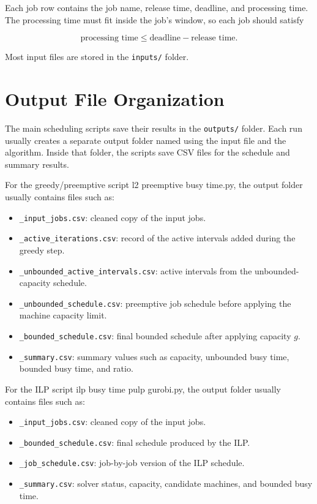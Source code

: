 \documentclass[12pt]{article}
\begin{document}
Each job row contains the job name, release time, deadline, and processing time.
The processing time must fit inside the job's window, so each job should satisfy

\[
\text{processing time} \leq \text{deadline} - \text{release time}.
\]

Most input files are stored in the \texttt{inputs/} folder.

\section*{Output File Organization}

The main scheduling scripts save their results in the \texttt{outputs/} folder.
Each run usually creates a separate output folder named using the input file and
the algorithm. Inside that folder, the scripts save CSV files for the schedule
and summary results.

For the greedy/preemptive script l2 preemptive busy time.py, the output folder usually contains files such
as:

\begin{itemize}[leftmargin=*]
    \item \texttt{\_input\_jobs.csv}: cleaned copy of the input jobs.
    \item \texttt{\_active\_iterations.csv}: record of the active intervals added
    during the greedy step.
    \item \texttt{\_unbounded\_active\_intervals.csv}: active intervals from the
    unbounded-capacity schedule.
    \item \texttt{\_unbounded\_schedule.csv}: preemptive job schedule before
    applying the machine capacity limit.
    \item \texttt{\_bounded\_schedule.csv}: final bounded schedule after applying
    capacity \(g\).
    \item \texttt{\_summary.csv}: summary values such as capacity, unbounded busy
    time, bounded busy time, and ratio.
\end{itemize}

For the ILP script ilp busy time pulp gurobi.py, the output folder usually contains files such as:

\begin{itemize}[leftmargin=*]
    \item \texttt{\_input\_jobs.csv}: cleaned copy of the input jobs.
    \item \texttt{\_bounded\_schedule.csv}: final schedule produced by the ILP.
    \item \texttt{\_job\_schedule.csv}: job-by-job version of the ILP schedule.
    \item \texttt{\_summary.csv}: solver status, capacity, candidate machines,
    and bounded busy time.
\end{itemize}
\end{document}
